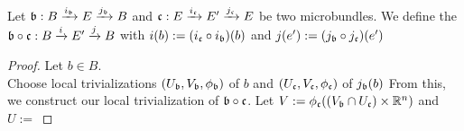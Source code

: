 \\ Let $\bundleb:\bundle{B}{E}{i_\bundleb}{j_\bundleb}$ and $\bundlec:\bundle{E}{E'}{i_\bundlec}{j_\bundlec}$ be two microbundles.
We define the  $\bundleb \circ \bundlec:\bundle{B}{E'}{i}{j}$ with $i(b) := (i_\bundlec \circ i_\bundleb)(b)$ and $j(e') := (j_\bundleb \circ j_\bundlec)(e')$
\begin{proof}
Let $b \in B$. \\
Choose local trivializations $(U_\bundleb, V_\bundleb, \phi_\bundleb)$ of $b$ and $(U_\bundlec, V_\bundlec, \phi_\bundlec)$ of $j_\bundleb(b)$
From this, we construct our local trivialization of $\bundleb \circ \bundlec$.
Let $V := \phi_\bundlec((V_\bundleb \cap U_\bundlec) \times \R^n)$ and
$U := $
\end{proof}